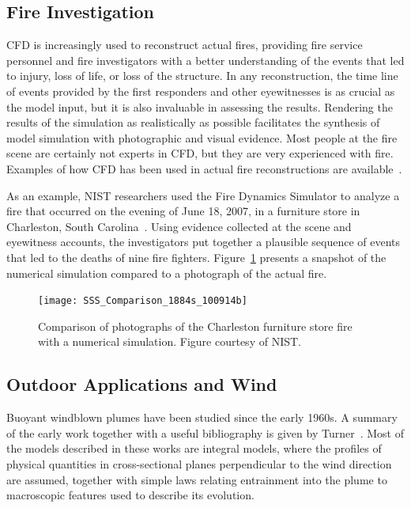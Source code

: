 \documentclass[graybox]{svmult}
\begin{document}
\subsection{Fire Investigation}

CFD is increasingly used to reconstruct  actual  fires,  providing  fire  service  personnel and fire investigators with a better understanding of the events that led to injury, loss of life, or loss of the structure. In any reconstruction, the time line of events provided by the first responders and other eyewitnesses is as crucial as the model input, but it is also invaluable in assessing the results. Rendering the results of the simulation as realistically as possible facilitates the synthesis of model simulation with photographic and visual evidence. Most people at the fire scene are certainly not experts in CFD, but they are very experienced with fire. Examples of how CFD has been used in actual fire reconstructions are available~\cite{Grosshandler, McGrattan:2005, Madrzykowski:2000, Madrzykowski:2004, Christensen}.

As an example, NIST researchers used the Fire Dynamics Simulator to analyze a fire that occurred on the evening of June 18, 2007, in a furniture store in Charleston, South Carolina~\cite{Bryner:2011}. Using evidence collected at the scene and eyewitness accounts, the investigators put together a plausible sequence of events that led to the deaths of nine fire fighters. Figure~\ref{furniture_store} presents a snapshot of the numerical simulation compared to a photograph of the actual fire.
\begin{figure}[ht]
\texttt{[image: SSS\_Comparison\_1884s\_100914b]}
\caption{Comparison of photographs of the Charleston furniture store fire with a numerical simulation. Figure courtesy of NIST.}
\label{furniture_store}
\end{figure}



\subsection{Outdoor Applications and Wind}

Buoyant windblown plumes have been studied since the early 1960s. A summary of the early work together with a useful bibliography is given by Turner~\cite{Turner}. Most of the models described in these works are integral models, where the profiles of physical quantities in cross-sectional planes perpendicular to the wind direction are assumed, together with simple laws relating entrainment into the plume to macroscopic features used to describe its evolution.
\end{document}
